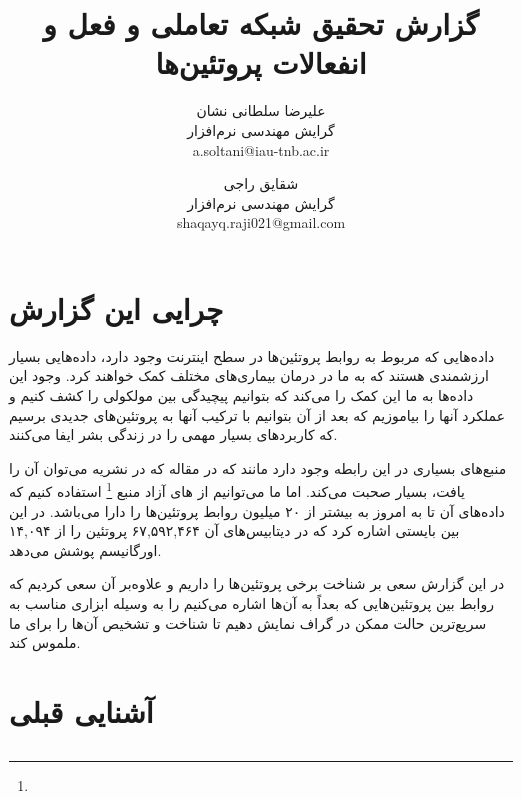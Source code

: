 \documentclass[10pt, a4paper]{article}
\title{گزارش تحقیق شبکه تعاملی و فعل و انفعالات پروتئین‌ها}
\author{
    علیرضا سلطانی نشان \\
    گرایش مهندسی نرم‌افزار \\
    a.soltani@iau-tnb.ac.ir
  \and
    شقایق راجی \\
    گرایش مهندسی نرم‌افزار \\
    shaqayq.raji021@gmail.com
}
\begin{document}
\maketitle

\section*{چرایی این گزارش}

داده‌هایی که مربوط به روابط پروتئین‌ها در سطح اینترنت وجود دارد، داده‌هایی بسیار
ارزشمندی هستند که به ما در درمان بیماری‌های مختلف کمک خواهند کرد. وجود این
داده‌ها به ما این کمک را می‌کند که بتوانیم پیچیدگی بین مولکولی را کشف کنیم و
عملکرد آنها را بیاموزیم که بعد از آن بتوانیم با ترکیب آنها به پروتئین‌های جدیدی
برسیم که کاربرد‌های بسیار مهمی را در زندگی بشر ایفا می‌کنند.

منبع‌های بسیاری در این رابطه وجود دارد مانند  \cite{konc2022protein}
که در مقاله  که در نشریه 
می‌توان آن را یافت، بسیار صحبت می‌کند. اما ما می‌توانیم از های آزاد منبع
 \footnote{  } استفاده کنیم که داده‌های آن تا به امروز به بیشتر
از ۲۰ میلیون روابط پروتئین‌ها را دارا می‌باشد. در این بین بایستی اشاره کرد که در
دیتابیس‌های آن ۶۷,۵۹۲,۴۶۴ پروتئین را از ۱۴,۰۹۴ اورگانیسم پوشش می‌دهد.

در این گزارش سعی بر شناخت برخی پروتئین‌ها را داریم و علاوه‌بر آن سعی کردیم که
روابط بین پروتئین‌هایی که بعداً به آن‌ها اشاره‌ می‌کنیم را به وسیله ابزاری مناسب
به سریع‌ترین حالت ممکن در گراف نمایش دهیم تا شناخت و تشخیص آن‌ها را برای ما
ملموس کند.

\newpage
\tableofcontents
\newpage

\section{آشنایی قبلی}

\subsection{}
\end{document}
